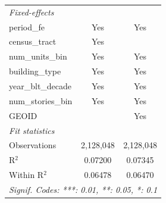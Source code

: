 \begin{tabular}{lcc}
   \midrule
   \emph{Fixed-effects}\\
   period\_fe                                                          & Yes             & Yes\\  
   census\_tract                                                       & Yes             & \\  
   num\_units\_bin                                                     & Yes             & Yes\\  
   building\_type                                                      & Yes             & Yes\\  
   year\_blt\_decade                                                   & Yes             & Yes\\  
   num\_stories\_bin                                                   & Yes             & Yes\\  
   GEOID                                                               &                 & Yes\\  
   \midrule
   \emph{Fit statistics}\\
   Observations                                                        & 2,128,048       & 2,128,048\\  
   R$^2$                                                               & 0.07200         & 0.07345\\  
   Within R$^2$                                                        & 0.06478         & 0.06470\\  
   \midrule \midrule
   \multicolumn{3}{l}{\emph{Signif. Codes: ***: 0.01, **: 0.05, *: 0.1}}\\
\end{tabular}
\par\endgroup
